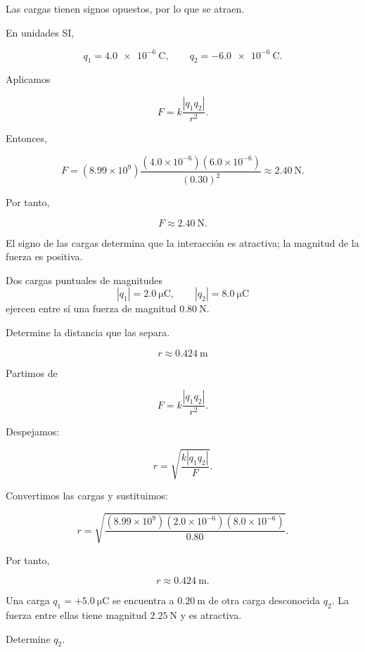 \begin{explicacion}
Las cargas tienen signos opuestos, por lo que se atraen.

En unidades SI,

\[
q_1=\SI{4.0e-6}{\coulomb}, \qquad q_2=-\SI{6.0e-6}{\coulomb}.
\]

Aplicamos

\[
F=k\frac{|q_1q_2|}{r^2}.
\]

Entonces,

\[
F=(8.99\times10^9)
\frac{(4.0\times10^{-6})(6.0\times10^{-6})}{(0.30)^2}
\approx\SI{2.40}{\newton}.
\]

Por tanto,

\[
\boxed{F\approx\SI{2.40}{\newton}}.
\]

El signo de las cargas determina que la interacción es atractiva; la magnitud
de la fuerza es positiva.
\end{explicacion}


\begin{ejercicio}
Dos cargas puntuales de magnitudes
\[
|q_1|=\SI{2.0}{\micro\coulomb}, \qquad
|q_2|=\SI{8.0}{\micro\coulomb}
\]
ejercen entre sí una fuerza de magnitud \(\SI{0.80}{\newton}\).

Determine la distancia que las separa.
\end{ejercicio}

\begin{respuesta}
\[
\boxed{r\approx\SI{0.424}{\metre}}
\]
\end{respuesta}

\begin{explicacion}
Partimos de

\[
F=k\frac{|q_1q_2|}{r^2}.
\]

Despejamos:

\[
r=\sqrt{\frac{k|q_1q_2|}{F}}.
\]

Convertimos las cargas y sustituimos:

\[
r=
\sqrt{
\frac{(8.99\times10^9)(2.0\times10^{-6})(8.0\times10^{-6})}{0.80}
}.
\]

Por tanto,

\[
\boxed{r\approx\SI{0.424}{\metre}}.
\]
\end{explicacion}


\begin{ejercicio}
Una carga \(q_1=+\SI{5.0}{\micro\coulomb}\) se encuentra a
\(\SI{0.20}{\metre}\) de otra carga desconocida \(q_2\). La fuerza entre
ellas tiene magnitud \(\SI{2.25}{\newton}\) y es atractiva.

Determine \(q_2\).
\end{ejercicio}

